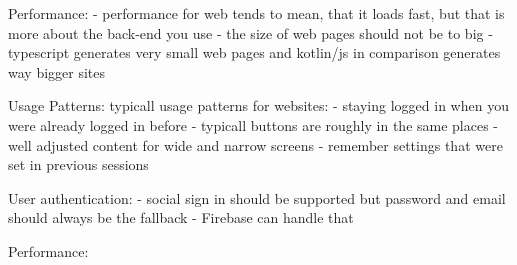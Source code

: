 Performance: 
- performance for web tends to mean, that it loads fast, but that is more about the back-end you use
- the size of web pages should not be to big
- typescript generates very small web pages and kotlin/js in comparison generates way bigger sites

Usage Patterns: 
typicall usage patterns for websites:
- staying logged in when you were already logged in before
- typicall buttons are roughly in the same places
- well adjusted content for wide and narrow screens
- remember settings that were set in previous sessions

User authentication: 
- social sign in should be supported but password and email should always be the fallback
- Firebase can handle that





Performance:




